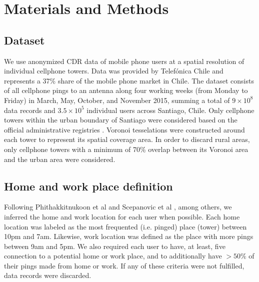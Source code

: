 \documentclass[%
preprint,
 amsmath,amssymb,
pra,
]{revtex4-1}
\begin{document}
\section{Materials and Methods} \label{MM}
\subsection{Dataset}
We use anonymized CDR data of mobile phone users at a spatial resolution of individual cellphone towers. Data was provided by Telef\'onica Chile and represents a 37\% share of the mobile phone market in Chile. The dataset consists of all cellphone pings to an antenna along four working weeks (from Monday to Friday) in March, May, October, and November 2015, summing a total of $9\times 10^8$ data records and $3.5\times10^5$ individual users across Santiago, Chile.
Only cellphone towers within the urban boundary of Santiago were considered based on the official administrative registries \cite{MINVU}. Voronoi tesselations were constructed around each tower to represent its spatial coverage area. In order to discard rural areas, only cellphone towers with a minimum of 70\% overlap between its Voronoi area and the urban area were considered.

\subsection{Home and work place definition}
\label{HWdef}
Following  Phithakkitnukoon et al \cite{phithakkitnukoon2012socio} and Scepanovic et al \cite{vscepanovic2015mobile}, among others, we inferred the home and work location for each user when possible. Each home location was labeled as the most frequented (i.e. pinged) place (tower) between 10pm and 7am. Likewise, work location was defined as the place with more pings between 9am and 5pm. We also required each user to have, at least, five connection to a potential home or work place, and to additionally have  $> 50\%$ of their pings made from home or work. If any of these criteria were not fulfilled, data records were discarded. 
\end{document}
